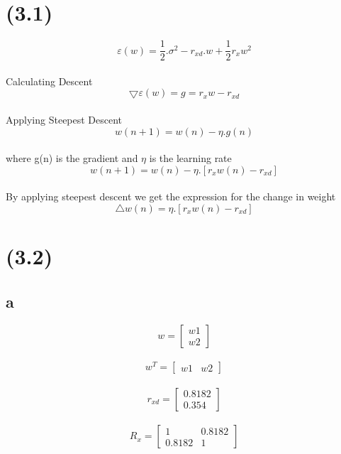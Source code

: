 \documentclass[paper=a4, fontsize=11pt]{scrartcl} %
\begin{document}
\section{ (3.1) }
\[\varepsilon (w) = \frac{1}{2}.\sigma^{2} -r_{xd}.w + \frac{1}{2}r_{x}w^{2}\] \\
Calculating Descent
\[\bigtriangledown \varepsilon (w) = g = r_{x}w - r_{xd} \]\\
Applying Steepest Descent
\[w(n+1) = w(n) - \eta .g(n) \]\\ 
where g(n) is the gradient and $\eta$ is the learning rate
\[w(n+1) = w(n) - \eta .[r_{x}w(n) - r_{xd}]\] \\ 
By applying steepest descent we get the expression for the change in weight
\[\bigtriangleup w(n) = \eta .[r_{x}w(n) - r_{xd}]\]


\section{ (3.2) }
\subsection{a}
\[w = \begin{bmatrix} w1\\ w2 \end{bmatrix}\] \\ 
\[w^{T} = \begin{bmatrix} w1 & w2 \end{bmatrix} \]\\ 
\[r_{xd} = \begin{bmatrix}

 0.8182\\ 0.354 \end{bmatrix} \]\\ 
\[R_{x} = \begin{bmatrix} 1 & 0.8182\\ 0.8182 & 1 \end{bmatrix}\] \\ 
\end{document}
